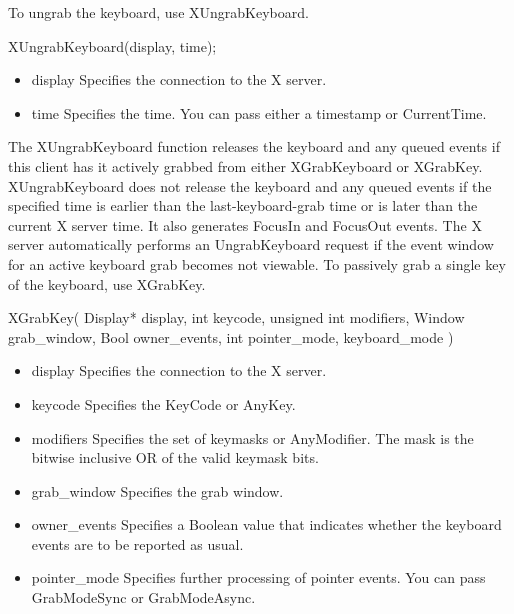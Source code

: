 \documentclass{report}
\begin{document}
\begin{itemize}
            To ungrab the keyboard, use XUngrabKeyboard.
            \bigbreak \noindent 
            \begin{cppcode}
            XUngrabKeyboard(display, time);
            \end{cppcode}
            \begin{itemize}
                \item display Specifies the connection to the X server.
                \item time Specifies the time. You can pass either a timestamp or CurrentTime.
            \end{itemize}
            \bigbreak \noindent 
            The XUngrabKeyboard function releases the keyboard and any queued events if this client has it actively grabbed from either XGrabKeyboard or XGrabKey. XUngrabKeyboard does not release the keyboard and any queued events if the specified time is earlier than the last-keyboard-grab time or is later than the current X server time. It also generates FocusIn and FocusOut events. The X server automatically performs an UngrabKeyboard request if the event window for an active keyboard grab becomes not viewable.
            \bigbreak \noindent 
            To passively grab a single key of the keyboard, use XGrabKey.
            \bigbreak \noindent 
            \begin{cppcode}
                XGrabKey(
                    Display* display,
                    int keycode,
                    unsigned int modifiers,
                    Window grab_window,
                    Bool owner_events,
                    int pointer_mode, keyboard_mode
                )
            \end{cppcode}
            \begin{itemize}
                \item display Specifies the connection to the X server.
                \item keycode Specifies the KeyCode or AnyKey.
                \item modifiers Specifies the set of keymasks or AnyModifier. The mask is the bitwise inclusive OR of the valid keymask bits.
                \item grab\_window Specifies the grab window.
                \item owner\_events Specifies a Boolean value that indicates whether the keyboard events are to be reported as usual.
                \item pointer\_mode Specifies further processing of pointer events. You can pass GrabModeSync or GrabModeAsync.

\end{itemize}
\end{itemize}
\end{document}

